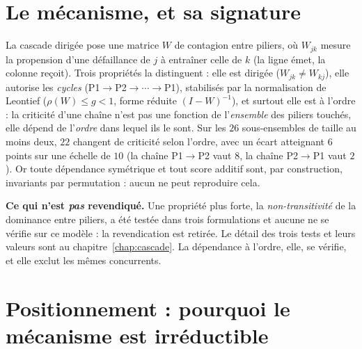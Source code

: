 \section{Le mécanisme, et sa signature}

La cascade dirigée pose une matrice $W$ de contagion entre piliers, où $W_{jk}$ mesure la
propension d'une défaillance de $j$ à entraîner celle de $k$ (la ligne émet, la colonne
reçoit). Trois propriétés la
distinguent : elle est dirigée ($W_{jk}\neq W_{kj}$), elle autorise les
\emph{cycles} (P1$\to$P2$\to\cdots\to$P1), stabilisés par la normalisation de Leontief
($\rho(W)\le g<1$, forme réduite $(I-W)^{-1}$), et surtout elle est à l'ordre : la
criticité d'une chaîne n'est pas une fonction de l'\emph{ensemble} des piliers touchés, elle
dépend de l'\emph{ordre} dans lequel ils le sont. Sur les $26$ sous-ensembles de taille au
moins deux, $22$ changent de criticité selon l'ordre, avec un écart atteignant $6$ points sur
une échelle de $10$ (la chaîne P1$\to$P2 vaut $8$, la chaîne P2$\to$P1 vaut $2$). Or toute dépendance symétrique et tout score additif sont,
par construction, invariants par permutation : aucun ne peut reproduire cela.

\begin{cle}
\textbf{Ce qui n'est \emph{pas} revendiqué.} Une propriété plus forte, la
\emph{non-transitivité} de la dominance entre piliers, a été testée dans trois formulations
et aucune ne se vérifie sur ce modèle : la revendication est retirée. Le détail des trois
tests et leurs valeurs sont au chapitre~\ref{chap:cascade}. La dépendance à l'ordre, elle,
se vérifie, et elle exclut les mêmes concurrents.
\end{cle}

\section{Positionnement : pourquoi le mécanisme est irréductible}

